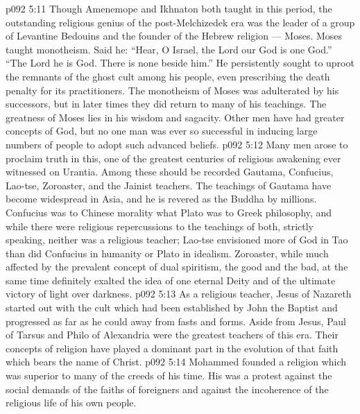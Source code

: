 \vs p092 5:11 \bibnobreakspace {} Though Amenemope and Ikhnaton both taught in this period, the outstanding religious genius of the post\hyp{}Melchizedek era was the leader of a group of Levantine Bedouins and the founder of the Hebrew religion --- Moses. Moses taught monotheism. Said he: “Hear, O Israel, the Lord our God is one God.” “The Lord he is God. There is none beside him.” He persistently sought to uproot the remnants of the ghost cult among his people, even prescribing the death penalty for its practitioners. The monotheism of Moses was adulterated by his successors, but in later times they did return to many of his teachings. The greatness of Moses lies in his wisdom and sagacity. Other men have had greater concepts of God, but no one man was ever so successful in inducing large numbers of people to adopt such advanced beliefs.
\vs p092 5:12 \bibnobreakspace {} Many men arose to proclaim truth in this, one of the greatest centuries of religious awakening ever witnessed on Urantia. Among these should be recorded Gautama, Confucius, Lao\hyp{}tse, Zoroaster, and the Jainist teachers. The teachings of Gautama have become widespread in Asia, and he is revered as the Buddha by millions. Confucius was to Chinese morality what Plato was to Greek philosophy, and while there were religious repercussions to the teachings of both, strictly speaking, neither was a religious teacher; Lao\hyp{}tse envisioned more of God in Tao than did Confucius in humanity or Plato in idealism. Zoroaster, while much affected by the prevalent concept of dual spiritism, the good and the bad, at the same time definitely exalted the idea of one eternal Deity and of the ultimate victory of light over darkness.
\vs p092 5:13 \bibnobreakspace {} As a religious teacher, Jesus of Nazareth started out with the cult which had been established by John the Baptist and progressed as far as he could away from fasts and forms. Aside from Jesus, Paul of Tarsus and Philo of Alexandria were the greatest teachers of this era. Their concepts of religion have played a dominant part in the evolution of that faith which bears the name of Christ.
\vs p092 5:14 \bibnobreakspace {} Mohammed founded a religion which was superior to many of the creeds of his time. His was a protest against the social demands of the faiths of foreigners and against the incoherence of the religious life of his own people.
